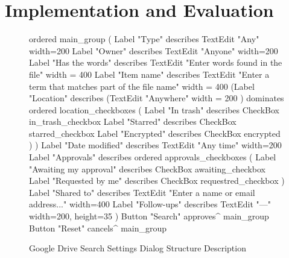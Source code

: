 
\section{Implementation and Evaluation}

\begin{figure}[t]
\begin{verbnobox}[\fontsize{10pt}{10pt}\selectfont]
ordered main_group (
  Label "Type" describes TextEdit "Any" {width=200}
  Label "Owner" describes TextEdit "Anyone" {width=200}
  Label "Has the words" describes TextEdit "Enter words found in the file" {
   width = 400
  }
  Label "Item name" describes
    TextEdit "Enter a term that matches part of the file name" {
      width = 400
    }
  (Label "Location" describes
    (TextEdit "Anywhere" { width = 200 }) dominates
    ordered location_checkboxes (
      Label "In trash"  describes CheckBox in_trash_checkbox
      Label "Starred"   describes CheckBox starred_checkbox
      Label "Encrypted" describes CheckBox encrypted
    )
  )
  Label "Date modified" describes  TextEdit "Any time" {width=200}
  Label "Approvals" describes
    ordered approvals_checkboxes (
      Label "Awaiting my approval" describes CheckBox awaiting_checkbox
      Label "Requested by me" describes CheckBox requestred_checkbox
  )
  Label "Shared to" describes
    TextEdit "Enter a name or email address..." {width=400}
  Label "Follow-ups" describes TextEdit "---" {width=200, height=35}
)
Button "Search" approves^ main_group
Button "Reset" cancels^ main_group
\end{verbnobox}
\caption{Google Drive Search Settings Dialog Structure Description}
\label{gd_structure}
\end{figure}

